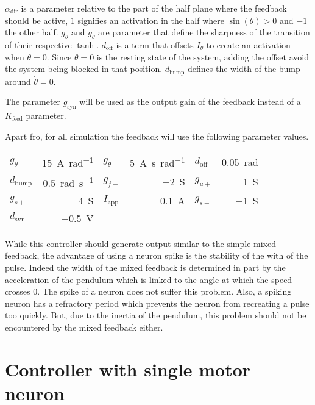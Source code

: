 $\alpha_\text{dir}$ is a parameter relative to the part of the half plane where the feedback should be active, $1$ signifies an activation in the half where $\sin\left(\theta\right)>0$ and $-1$ the other half. 
$g_\theta$ and $g_{\dot{\theta}}$ are parameter that define the sharpness of the transition of their respective $\tanh$.
$d_\text{off}$ is a term that offsets $I_\theta$ to create an activation when $\theta = 0$. Since $\theta = 0$ is the resting state of the system, adding the offset avoid the system being blocked in that position.
$d_\text{bump}$ defines the width of the bump around $\dot{\theta} = 0$. 

The parameter $g_{\text{syn}}$ will be used as the output gain of the feedback instead of a $K_\text{feed}$ parameter. 

Apart fro, for all simulation the feedback will use the following parameter values.
{

\large\centering
\begin{tabular}{lr|lr|lr}
    $g_\theta$      & \qty{15}{\ampere\per\radian}  & $g_{\dot{\theta}}$    & \qty{5}{\ampere\second\per\radian} & $d_\text{off}$  &    \qty{0.05}{\radian}\\
    $d_\text{bump}$       & \qty{0.5}{\radian\per\second} & $g_{f-}$    & \qty{-2}{\siemens}   & $g_{u+}$          & \qty{1}{\siemens}\\
    $g_{s+}$    & \qty{4}{\siemens}    & $I_\text{app}$    & \qty{0.1}{\ampere} & $g_{s-}$    & \qty{-1}{\siemens}\\
    $d_\text{syn}$    & \qty{-0.5}{\volt} & & & &
\end{tabular}

}

While this controller should generate output similar to the simple mixed feedback, the advantage of using a neuron spike is the stability of the with of the pulse.
Indeed the width of the mixed feedback is determined in part by the acceleration of the pendulum which is linked to the angle at which the speed crosses $0$. 
The spike of a neuron does not suffer this problem. 
Also, a spiking neuron has a refractory period which prevents the neuron from recreating a pulse too quickly. 
But, due to the inertia of the pendulum, this problem should not be encountered by the mixed feedback either. 

\section{Controller with single motor neuron}

